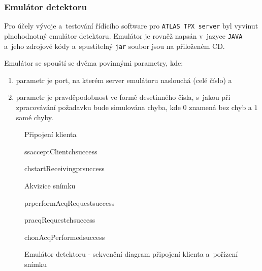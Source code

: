 \subsubsection{Emulátor detektoru}\label{atlas:cont:emulator}
Pro účely vývoje a~testování řídícího software pro \texttt{ATLAS TPX server} byl vyvinut plnohodnotný emulátor detektoru. Emulátor je rovněž napsán v~jazyce \texttt{JAVA} a~jeho zdrojové kódy a~spustitelný \texttt{jar} soubor jsou na přiloženém CD.

Emulátor se spouští se dvěma povinnými parametry, kde:
\begin{enumerate}
	\item parametr je port, na kterém server emulátoru naslouchá (celé číslo) a
	\item parametr je pravděpodobnost ve formě desetinného čísla, s~jakou při zpracovávání požadavku bude simulována chyba, kde $0$ znamená bez chyb a $1$ samé chyby.
\end{enumerate}

\begin{figure}[t]
	\begin{center}
		\begin{sequencediagram}
			\begin{sdblock}{Připojení klienta}{}
				\begin{call}{ss}{acceptClient}{ch}{success}
					\begin{call}{ch}{startReceiving}{pr}{success}
					\end{call}
				\end{call}
			\end{sdblock}
			\begin{sdblock}{Akvizice snímku}{}
				\begin{callself}{pr}{performAcqRequest}{success}
					\begin{call}{pr}{acqRequest}{ch}{success}
					\end{call}	
				\end{callself}	
				\postlevel
				\begin{callself}{ch}{onAcqPerformed}{success}
				\end{callself}	
			\end{sdblock}			
		\end{sequencediagram}
		\caption{Emulátor detektoru - sekvenční diagram připojení klienta a~pořízení snímku}
		\label{fig:uml:emulator}
	\end{center}
\end{figure}


